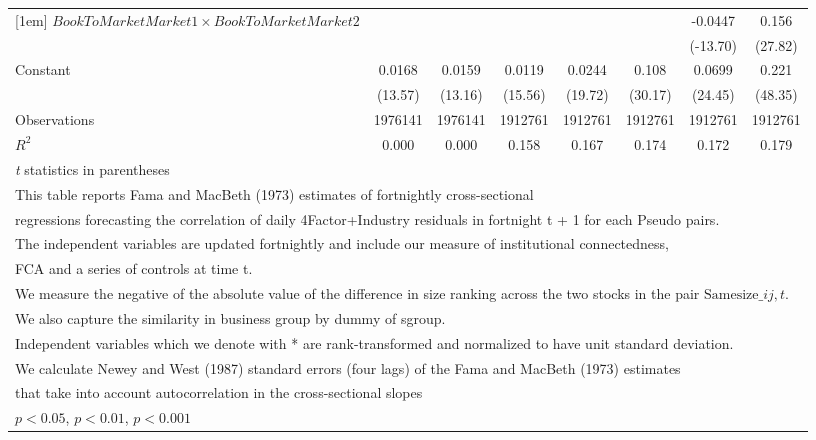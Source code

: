 {\begin{tabular}{l*{7}{c}}
[1em]
$ BookToMarketMarket1 \times BookToMarketMarket2 $&                     &                     &                     &                     &                     &     -0.0447\sym{***}&       0.156\sym{***}\\
                    &                     &                     &                     &                     &                     &    (-13.70)         &     (27.82)         \\
[1em]
Constant            &      0.0168\sym{***}&      0.0159\sym{***}&      0.0119\sym{***}&      0.0244\sym{***}&       0.108\sym{***}&      0.0699\sym{***}&       0.221\sym{***}\\
                    &     (13.57)         &     (13.16)         &     (15.56)         &     (19.72)         &     (30.17)         &     (24.45)         &     (48.35)         \\
\hline
Observations        &     1976141         &     1976141         &     1912761         &     1912761         &     1912761         &     1912761         &     1912761         \\
\(R^{2}\)           &       0.000         &       0.000         &       0.158         &       0.167         &       0.174         &       0.172         &       0.179         \\
\hline\hline
\multicolumn{8}{l}{\footnotesize \textit{t} statistics in parentheses}\\
\multicolumn{8}{l}{\footnotesize This table reports Fama and MacBeth (1973) estimates of fortnightly cross-sectional}\\
\multicolumn{8}{l}{\footnotesize  regressions forecasting the correlation of daily 4Factor+Industry residuals in fortnight t + 1 for each Pseudo pairs.}\\
\multicolumn{8}{l}{\footnotesize The independent variables are updated fortnightly and include our measure of institutional connectedness,}\\
\multicolumn{8}{l}{\footnotesize  FCA and a series of controls at time t.}\\
\multicolumn{8}{l}{\footnotesize We measure the negative of the absolute value of the difference in size ranking across the two stocks in the pair $ \text{Samesize}\_{ij,t} $.}\\
\multicolumn{8}{l}{\footnotesize We also capture the similarity in business group by dummy of sgroup.}\\
\multicolumn{8}{l}{\footnotesize Independent variables which  we denote with * are rank-transformed and normalized to have unit standard deviation.}\\
\multicolumn{8}{l}{\footnotesize  We calculate Newey and West (1987) standard errors (four lags) of the Fama and MacBeth (1973) estimates }\\
\multicolumn{8}{l}{\footnotesize  that take into account autocorrelation in the cross-sectional slopes}\\
\multicolumn{8}{l}{\footnotesize \sym{*} \(p<0.05\), \sym{**} \(p<0.01\), \sym{***} \(p<0.001\)}\\
\end{tabular}
}
